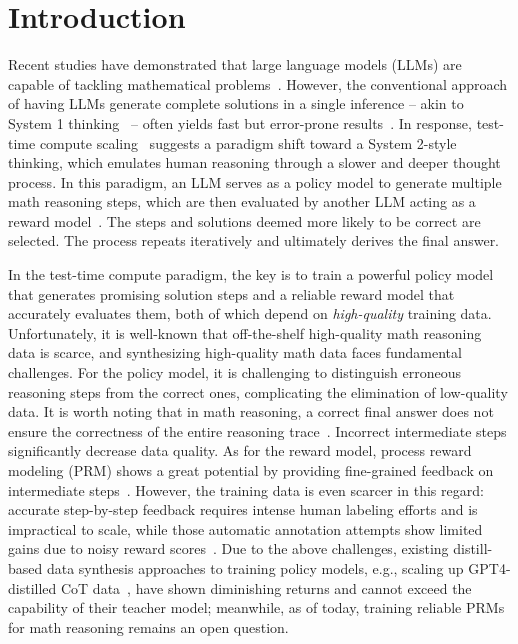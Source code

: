 \vspace{-4ex}
\section{Introduction}
\vspace{-1ex}

Recent studies have demonstrated that large language models (LLMs) are capable of tackling mathematical problems~\citep{qwq-32b-preview,qwen2.5,o1,deepseekv3}. However, the conventional approach of having LLMs generate complete solutions in a single inference -- akin to System 1 thinking~\citep{thinking} -- often yields fast but error-prone results~\citep{valmeekam2023planning,gpt4}. In response, test-time compute scaling~\citep{snell2024scaling,rstar} suggests a paradigm shift toward a System 2-style thinking, which emulates human reasoning through a slower and deeper thought process. In this paradigm, an LLM serves as a policy model to generate multiple math reasoning steps, which are then evaluated by another LLM acting as a reward model~\citep{o1}. The steps and solutions deemed more likely to be correct are selected. The process repeats iteratively and ultimately derives the final answer.



In the test-time compute paradigm, the key is to train a powerful policy model that generates promising solution steps and a reliable reward model that accurately evaluates them, both of which depend on \emph{high-quality} training data. Unfortunately, it is well-known that off-the-shelf high-quality math reasoning data is scarce, and synthesizing high-quality math data faces fundamental challenges. 
For the policy model, it is challenging to distinguish erroneous reasoning steps from the correct ones, complicating the elimination of low-quality data. It is worth noting that in math reasoning, a correct final answer does not ensure the correctness of the entire reasoning trace~\citep{lanham2023measuring}. Incorrect intermediate steps significantly decrease data quality.  
As for the reward model, process reward modeling (PRM) shows a great potential by providing fine-grained feedback on intermediate steps~\citep{lightman2023let}. However, the training data is even scarcer in this regard: accurate step-by-step feedback requires intense human labeling efforts and is impractical to scale, while those automatic annotation attempts show limited gains due to noisy reward scores~\citep{luo2024improve,mathshepherd,alphamath}. 
Due to the above challenges, existing distill-based data synthesis approaches to training policy models, e.g., scaling up GPT4-distilled CoT data~\citep{mathscale,o1journeypart2}, have shown diminishing returns and cannot exceed the capability of their teacher model; meanwhile, as of today, training reliable PRMs for math reasoning remains an open question.




